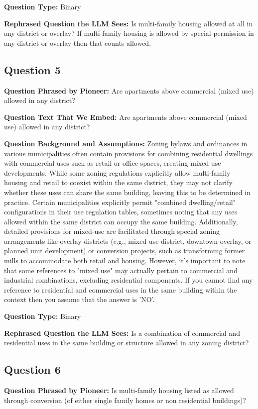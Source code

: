 \noindent\textbf{Question Type:} Binary

\noindent\textbf{Rephrased Question the LLM Sees:} Is multi-family housing allowed at all in any district or overlay? If multi-family housing is allowed by special permission in any district or overlay then that counts allowed.

\vspace{1cm}
\subsection*{Question 5}
\noindent\textbf{Question Phrased by Pioneer:} Are apartments above commercial (mixed use) allowed in any district?

\noindent\textbf{Question Text That We Embed:} Are apartments above commercial (mixed use) allowed in any district?

\noindent\textbf{Question Background and Assumptions:} Zoning bylaws and ordinances in various municipalities often contain provisions for combining residential dwellings with commercial uses such as retail or office spaces, creating mixed-use developments. While some zoning regulations explicitly allow multi-family housing and retail to coexist within the same district, they may not clarify whether these uses can share the same building, leaving this to be determined in practice. Certain municipalities explicitly permit "combined dwelling/retail" configurations in their use regulation tables, sometimes noting that any uses allowed within the same district can occupy the same building. Additionally, detailed provisions for mixed-use are facilitated through special zoning arrangements like overlay districts (e.g., mixed use district, downtown overlay, or planned unit development) or conversion projects, such as transforming former mills to accommodate both retail and housing. However, it's important to note that some references to "mixed use" may actually pertain to commercial and industrial combinations, excluding residential components. If you cannot find any reference to residential and commercial uses in the same building within the context then you assume that the answer is 'NO'.

\noindent\textbf{Question Type:} Binary

\noindent\textbf{Rephrased Question the LLM Sees:} Is a combination of commercial and residential uses in the same building  or structure allowed in any zoning district?

\vspace{1cm}
\subsection*{Question 6}
\noindent\textbf{Question Phrased by Pioneer:} Is multi-family housing listed as allowed through conversion (of either single family homes or non residential buildings)?

